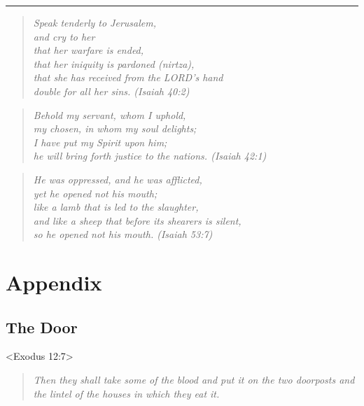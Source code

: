 \documentclass[10pt,oneside,footinclude=true,headinclude=true]{scrbook} %
\newcommand\quot[1]{
	\begin{quote}\textit{\small#1}\end{quote}
}
\begin{document}
\vspace{5mm}
\hrule
\vspace{5mm}

\quot{Speak tenderly to Jerusalem,\\
\hspace*{5mm}and cry to her\\
that her warfare is ended,\\
\hspace*{5mm}that her iniquity is pardoned (nirtza),\\
that she has received from the LORD's hand\\
\hspace*{5mm}double for all her sins. (Isaiah 40:2)}

\quot{Behold my servant, whom I uphold,\\
\hspace*{5mm}my chosen, in whom my soul delights;\\
I have put my Spirit upon him;\\
\hspace*{5mm}he will bring forth justice to the nations. (Isaiah 42:1)}

\quot{He was oppressed, and he was afflicted,\\
\hspace*{5mm}yet he opened not his mouth;\\
like a lamb that is led to the slaughter,\\
\hspace*{5mm}and like a sheep that before its shearers is silent,\\
\hspace*{5mm}so he opened not his mouth. (Isaiah 53:7)}


\appendix
\cleardoublepage
\part{Appendix}


\chapter{The Door}
<Exodus 12:7>
\quot{Then they shall take some of the blood and put it on the two doorposts and the lintel of the houses in which they eat it.}
\end{document}
